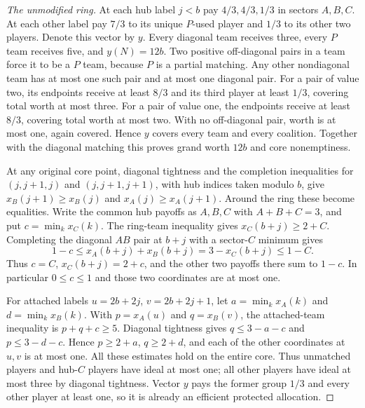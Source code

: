 \begin{proof}[The unmodified ring]
At each hub label $j<b$ pay $4/3,4/3,1/3$ in sectors $A,B,C$.
At each other label pay $7/3$ to its unique $P$-used player and $1/3$
to its other two players. Denote this vector by $y$. Every diagonal
team receives three, every $P$ team receives five, and $y(N)=12b$.
Two positive off-diagonal pairs in a team force it to be a $P$ team,
because $P$ is a partial matching. Any other nondiagonal team has at
most one such pair and at most one diagonal pair. For a pair of value
two, its endpoints receive at least $8/3$ and its third player at least
$1/3$, covering total worth at most three. For a pair of value one,
the endpoints receive at least $8/3$, covering total worth at most two.
With no off-diagonal pair, worth is at most one, again covered. Hence
$y$ covers every team and every coalition. Together with the diagonal
matching this proves grand worth $12b$ and core nonemptiness.

At any original core point, diagonal tightness and the completion
inequalities for $(j,j+1,j)$ and $(j,j+1,j+1)$, with hub indices taken
modulo $b$, give $x_B(j+1)\ge x_B(j)$ and $x_A(j)\ge x_A(j+1)$.
Around the ring these become equalities. Write the common hub payoffs
as $A,B,C$ with $A+B+C=3$, and put $c=\min_k x_C(k)$.
The ring-team inequality gives $x_C(b+j)\ge2+C$.
Completing the diagonal $AB$ pair at $b+j$ with a sector-$C$ minimum
gives
\[
       1-c\le x_A(b+j)+x_B(b+j)=3-x_C(b+j)\le1-C.
\]
Thus $c=C$, $x_C(b+j)=2+c$, and the other two payoffs there sum to
$1-c$. In particular $0\le c\le1$ and those two coordinates are at
most one.

For attached labels $u=2b+2j$, $v=2b+2j+1$, let
$a=\min_kx_A(k)$ and $d=\min_kx_B(k)$. With $p=x_A(u)$ and
$q=x_B(v)$, the attached-team inequality is $p+q+c\ge5$.
Diagonal tightness gives $q\le3-a-c$ and $p\le3-d-c$.
Hence $p\ge2+a$, $q\ge2+d$, and each of the other coordinates at
$u,v$ is at most one. All these estimates hold on the entire core.
Thus unmatched players and hub-$C$ players have ideal at most one;
all other players have ideal at most three by diagonal tightness.
Vector $y$ pays the former group $1/3$ and every other player at least
one, so it is already an efficient protected allocation.
\end{proof}

